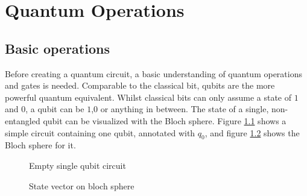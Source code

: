 
\chapter{Quantum Operations} %

\label{Chapter2}

\section{Basic operations}
\label{chapter:basic_opterations}

Before creating a quantum circuit, a basic understanding of quantum operations and gates is needed. Comparable to the classical bit, qubits are the more powerful quantum equivalent. Whilst classical bits can only assume a state of $1$ and $0$, a qubit can be $1$,$0$ or anything in between. The state of a single, non-entangled qubit can be visualized with the Bloch sphere\cite{bloch_nuclear_induction}. Figure \ref{fig:circuit_empty} shows a simple circuit containing one qubit, annotated with $q_0$, and figure \ref{fig:circuit_empty_bloch_sphere} shows the Bloch sphere for it.


\begin{figure}[!h]
    \centering
    \caption{Empty single qubit circuit}
    \label{fig:circuit_empty}
\end{figure}

\begin{figure}[!h]
    \centering
    \caption{State vector on bloch sphere}
    \label{fig:circuit_empty_bloch_sphere}
\end{figure}

